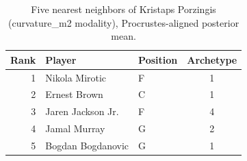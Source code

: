 \begin{table}[htbp]
  \centering\small
  \begin{tabular}{rllc}
    \toprule
    Rank & Player & Position & Archetype \\
    \midrule
    1 & Nikola Mirotic & F & 1 \\
    2 & Ernest Brown & C & 1 \\
    3 & Jaren Jackson Jr. & F & 4 \\
    4 & Jamal Murray & G & 2 \\
    5 & Bogdan Bogdanovic & G & 1 \\
    \bottomrule
  \end{tabular}
  \caption{Five nearest neighbors of Kristaps Porzingis (curvature_m2 modality), Procrustes-aligned posterior mean.}
  \label{tab:Kristaps_Porzingis_neighbors_curvature_m2}
\end{table}

